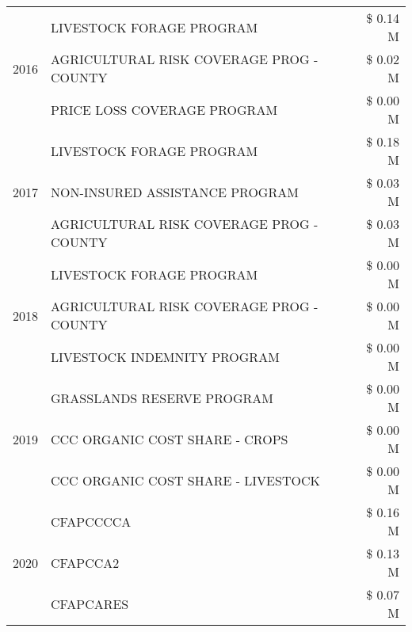 \begin{tabular}{llr}
\cline{1-3}
\multirow[t]{3}{*}{2016} & LIVESTOCK FORAGE PROGRAM                      & \$ 0.14 M \\
 & AGRICULTURAL RISK COVERAGE PROG - COUNTY      & \$ 0.02 M \\
 & PRICE LOSS COVERAGE PROGRAM                   & \$ 0.00 M \\
\cline{1-3}
\multirow[t]{3}{*}{2017} & LIVESTOCK FORAGE PROGRAM & \$ 0.18 M \\
 & NON-INSURED ASSISTANCE PROGRAM & \$ 0.03 M \\
 & AGRICULTURAL RISK COVERAGE PROG - COUNTY & \$ 0.03 M \\
\cline{1-3}
\multirow[t]{3}{*}{2018} & LIVESTOCK FORAGE PROGRAM & \$ 0.00 M \\
 & AGRICULTURAL RISK COVERAGE PROG - COUNTY & \$ 0.00 M \\
 & LIVESTOCK INDEMNITY PROGRAM & \$ 0.00 M \\
\cline{1-3}
\multirow[t]{3}{*}{2019} & GRASSLANDS RESERVE PROGRAM & \$ 0.00 M \\
 & CCC ORGANIC COST SHARE - CROPS & \$ 0.00 M \\
 & CCC ORGANIC COST SHARE - LIVESTOCK & \$ 0.00 M \\
\cline{1-3}
\multirow[t]{3}{*}{2020} & CFAPCCCCA & \$ 0.16 M \\
 & CFAPCCA2 & \$ 0.13 M \\
 & CFAPCARES & \$ 0.07 M \\
\cline{1-3}
\bottomrule
\end{tabular}
